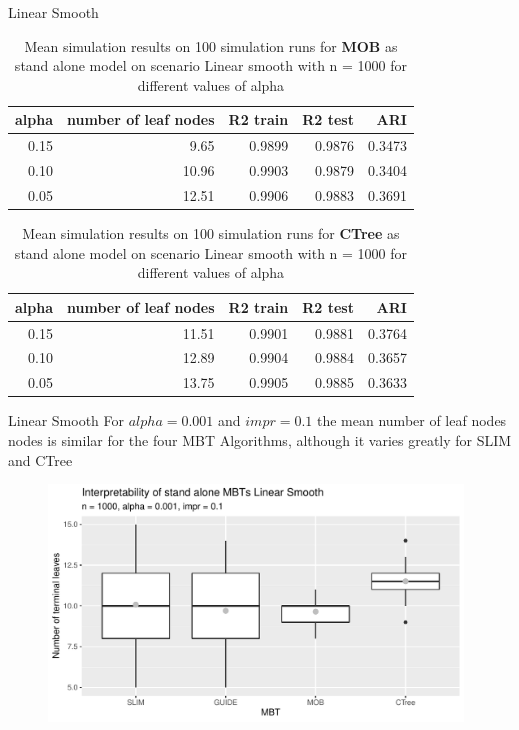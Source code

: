 \documentclass[9pt, xcolor=table]{beamer}
\begin{document}
\begin{frame}{Linear Smooth}
\begin{table}

\caption{Mean simulation results on 100 simulation runs for \textbf{MOB} as stand alone model on scenario Linear smooth with n = 1000 for different values of alpha}
\centering 
\begin{tabular}[t]{r|r|r|r|r}
\hline
alpha & number of leaf nodes & R2 train & R2 test & ARI\\
\hline
0.15 & 9.65 & 0.9899 & 0.9876 & 0.3473\\
\hline
0.10 & 10.96 & 0.9903 & 0.9879 & 0.3404\\
\hline
0.05 & 12.51 & 0.9906 & 0.9883 & 0.3691\\
\hline
\end{tabular}
\end{table} 


\begin{table}

\caption{Mean simulation results on 100 simulation runs for \textbf{CTree} as stand alone model on scenario Linear smooth with n = 1000 for different values of alpha}
\centering 
\begin{tabular}[t]{r|r|r|r|r}
\hline
alpha & number of leaf nodes & R2 train & R2 test & ARI\\
\hline
0.15 & 11.51 & 0.9901 & 0.9881 & 0.3764\\
\hline
0.10 & 12.89 & 0.9904 & 0.9884 & 0.3657\\
\hline
0.05 & 13.75 & 0.9905 & 0.9885 & 0.3633\\
\hline
\end{tabular}
\end{table}
\end{frame}



\begin{frame}{Linear Smooth}
For  $alpha= 0.001$ and $impr = 0.1$ the mean number of leaf nodes nodes is similar for the four MBT Algorithms, although it varies greatly for SLIM and CTree
\begin{figure}
    \includegraphics[width=11cm]{Figures/simulations/batchtools/basic_scenarios/linear_smooth/ls_1000_standalone_int.pdf}
\end{figure}   

    
\end{frame}
\end{document}
